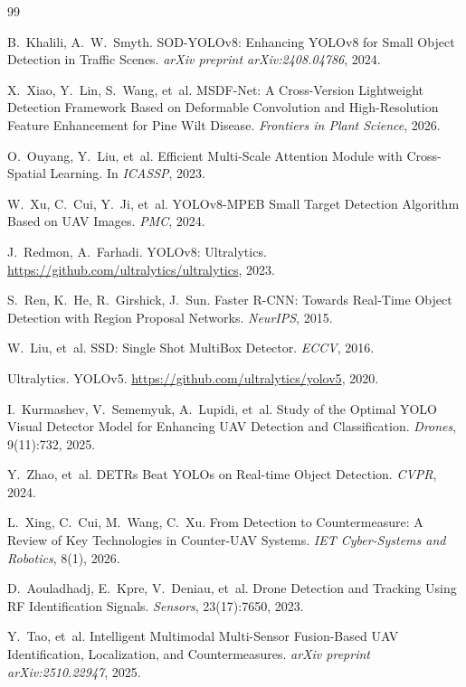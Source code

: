 \documentclass[12pt, a4paper]{ctexart}
\begin{document}
\begin{thebibliography}{99}

B.~Khalili, A.~W.~Smyth.
SOD-YOLOv8: Enhancing YOLOv8 for Small Object Detection in Traffic Scenes.
\emph{arXiv preprint arXiv:2408.04786}, 2024.

X.~Xiao, Y.~Lin, S.~Wang, et~al.
MSDF-Net: A Cross-Version Lightweight Detection Framework Based on Deformable Convolution and High-Resolution Feature Enhancement for Pine Wilt Disease.
\emph{Frontiers in Plant Science}, 2026.

O.~Ouyang, Y.~Liu, et~al.
Efficient Multi-Scale Attention Module with Cross-Spatial Learning.
In \emph{ICASSP}, 2023.

W.~Xu, C.~Cui, Y.~Ji, et~al.
YOLOv8-MPEB Small Target Detection Algorithm Based on UAV Images.
\emph{PMC}, 2024.

J.~Redmon, A.~Farhadi.
YOLOv8: Ultralytics.
\url{https://github.com/ultralytics/ultralytics}, 2023.

S.~Ren, K.~He, R.~Girshick, J.~Sun.
Faster R-CNN: Towards Real-Time Object Detection with Region Proposal Networks.
\emph{NeurIPS}, 2015.

W.~Liu, et~al.
SSD: Single Shot MultiBox Detector.
\emph{ECCV}, 2016.

Ultralytics.
YOLOv5.
\url{https://github.com/ultralytics/yolov5}, 2020.

I.~Kurmashev, V.~Sememyuk, A.~Lupidi, et~al.
Study of the Optimal YOLO Visual Detector Model for Enhancing UAV Detection and Classification.
\emph{Drones}, 9(11):732, 2025.

Y.~Zhao, et~al.
DETRs Beat YOLOs on Real-time Object Detection.
\emph{CVPR}, 2024.

L.~Xing, C.~Cui, M.~Wang, C.~Xu.
From Detection to Countermeasure: A Review of Key Technologies in Counter-UAV Systems.
\emph{IET Cyber-Systems and Robotics}, 8(1), 2026.

D.~Aouladhadj, E.~Kpre, V.~Deniau, et~al.
Drone Detection and Tracking Using RF Identification Signals.
\emph{Sensors}, 23(17):7650, 2023.

Y.~Tao, et~al.
Intelligent Multimodal Multi-Sensor Fusion-Based UAV Identification, Localization, and Countermeasures.
\emph{arXiv preprint arXiv:2510.22947}, 2025.


\end{thebibliography}
\end{document}
